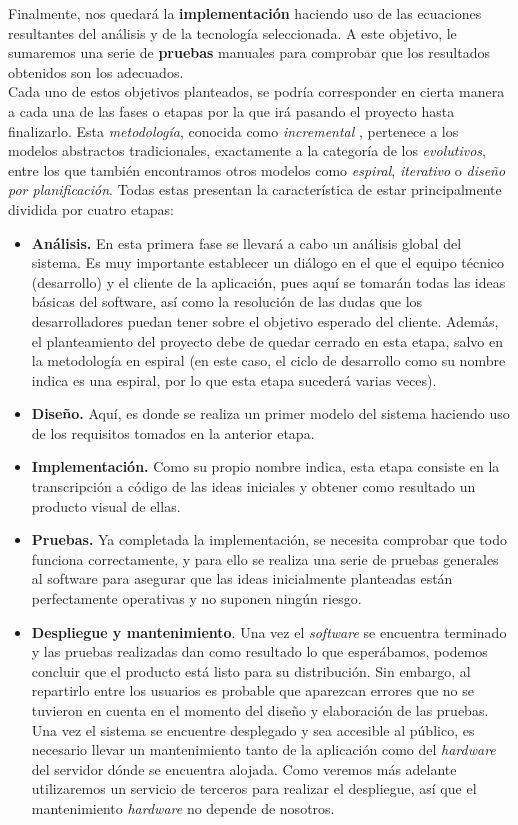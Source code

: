 \documentclass[../main.tex]{subfiles}
\begin{document}
Finalmente, nos quedará la \textbf{implementación} haciendo uso de las ecuaciones resultantes del análisis y de la tecnología seleccionada. A este objetivo, le sumaremos una serie de \textbf{pruebas} manuales para comprobar que los resultados obtenidos son los adecuados.\\

Cada uno de estos objetivos planteados, se podría corresponder en cierta manera a cada una de las fases o etapas por la que irá pasando el proyecto hasta finalizarlo. Esta \textit{metodología}, conocida como \textit{incremental} \cite{metodologiasSoftware}, pertenece a los modelos abstractos tradicionales, exactamente a la categoría de los \textit{evolutivos}, entre los que también encontramos otros modelos como \textit{espiral}, \textit{iterativo} o \textit{diseño por planificación}. Todas estas presentan la característica de estar principalmente dividida por cuatro etapas:\\

\begin{itemize}
    \item \textbf{Análisis.} En esta primera fase se llevará a cabo un análisis global del sistema. Es muy importante establecer un diálogo en el que el equipo técnico (desarrollo) y el cliente de la aplicación, pues aquí se tomarán todas las ideas básicas del software, así como la resolución de las dudas que los desarrolladores puedan tener sobre el objetivo esperado del cliente. Además, el planteamiento del proyecto debe de quedar cerrado en esta etapa, salvo en la metodología en espiral (en este caso, el ciclo de desarrollo como su nombre indica es una espiral, por lo que esta etapa sucederá varias veces).
    \item \textbf{Diseño.} \label{software_diseño_etapa} Aquí, es donde se realiza un primer modelo del sistema haciendo uso de los requisitos tomados en la anterior etapa.
    \item \textbf{Implementación.} Como su propio nombre indica, esta etapa consiste en la transcripción a código de las ideas iniciales y obtener como resultado un producto visual de ellas.
    \item \textbf{Pruebas.} Ya completada la implementación, se necesita comprobar que todo funciona correctamente, y para ello se realiza una serie de pruebas generales al software para asegurar que las ideas inicialmente planteadas están perfectamente operativas y no suponen ningún riesgo.
    \item \textbf{Despliegue y mantenimiento}. Una vez el \textit{software} se encuentra terminado y las pruebas realizadas dan como resultado lo que esperábamos, podemos concluir que el producto está listo para su distribución. Sin embargo, al repartirlo entre los usuarios es probable que aparezcan errores que no se tuvieron en cuenta en el momento del diseño y elaboración de las pruebas. Una vez el sistema se encuentre desplegado y sea accesible al público, es necesario llevar un mantenimiento tanto de la aplicación como del \textit{hardware} del servidor dónde se encuentra alojada. Como veremos más adelante utilizaremos un servicio de terceros para realizar el despliegue, así que el mantenimiento \textit{hardware} no depende de nosotros.
\end{itemize}
\end{document}
